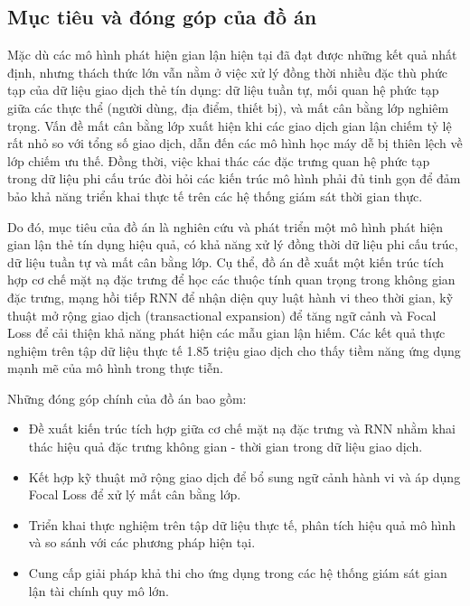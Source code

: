 \subsection*{Mục tiêu và đóng góp của đồ án}
Mặc dù các mô hình phát hiện gian lận hiện tại đã đạt được những kết quả nhất định, nhưng thách thức lớn vẫn nằm ở việc xử lý đồng thời nhiều đặc thù phức tạp của dữ liệu giao dịch thẻ tín dụng: dữ liệu tuần tự, mối quan hệ phức tạp giữa các thực thể (người dùng, địa điểm, thiết bị), và mất cân bằng lớp nghiêm trọng. Vấn đề mất cân bằng lớp xuất hiện khi các giao dịch gian lận chiếm tỷ lệ rất nhỏ so với tổng số giao dịch, dẫn đến các mô hình học máy dễ bị thiên lệch về lớp chiếm ưu thế. Đồng thời, việc khai thác các đặc trưng quan hệ phức tạp trong dữ liệu phi cấu trúc đòi hỏi các kiến trúc mô hình phải đủ tinh gọn để đảm bảo khả năng triển khai thực tế trên các hệ thống giám sát thời gian thực.

Do đó, mục tiêu của đồ án là nghiên cứu và phát triển một mô hình phát hiện gian lận thẻ tín dụng hiệu quả, có khả năng xử lý đồng thời dữ liệu phi cấu trúc, dữ liệu tuần tự và mất cân bằng lớp. Cụ thể, đồ án đề xuất một kiến trúc tích hợp cơ chế mặt nạ đặc trưng để học các thuộc tính quan trọng trong không gian đặc trưng, mạng hồi tiếp RNN để nhận diện quy luật hành vi theo thời gian, kỹ thuật mở rộng giao dịch (transactional expansion) để tăng ngữ cảnh và Focal Loss để cải thiện khả năng phát hiện các mẫu gian lận hiếm. Các kết quả thực nghiệm trên tập dữ liệu thực tế 1.85 triệu giao dịch cho thấy tiềm năng ứng dụng mạnh mẽ của mô hình trong thực tiễn.

Những đóng góp chính của đồ án bao gồm:

\begin{itemize}
    \item Đề xuất kiến trúc tích hợp giữa cơ chế mặt nạ đặc trưng và RNN nhằm khai thác hiệu quả đặc trưng không gian - thời gian trong dữ liệu giao dịch.
    \item Kết hợp kỹ thuật mở rộng giao dịch để bổ sung ngữ cảnh hành vi và áp dụng Focal Loss để xử lý mất cân bằng lớp.
    \item Triển khai thực nghiệm trên tập dữ liệu thực tế, phân tích hiệu quả mô hình và so sánh với các phương pháp hiện tại.
    \item Cung cấp giải pháp khả thi cho ứng dụng trong các hệ thống giám sát gian lận tài chính quy mô lớn.
\end{itemize}

